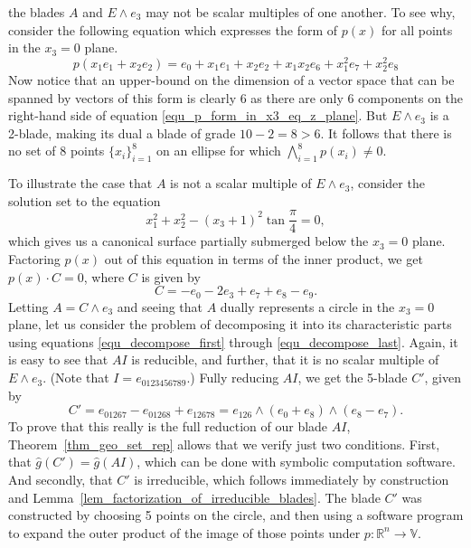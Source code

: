 \documentclass{birkjour}
\theoremstyle{definition}
\theoremstyle{remark}
\numberwithin{equation}{section}
\newcommand{\R}{\mathbb{R}}
\newcommand{\V}{\mathbb{V}}
\newcommand{\gh}{\hat{g}}
\begin{document}
the blades $A$ and $E\wedge e_3$ may not be scalar multiples of one another.
To see why, consider the following equation which expresses the form of $p(x)$ for all points in the $x_3=0$ plane.
\begin{equation}\label{equ_p_form_in_x3_eq_z_plane}
p(x_1e_1+x_2e_2)=e_0 + x_1e_1 + x_2e_2 + x_1x_2e_6 + x_1^2e_7 + x_2^2e_8
\end{equation}
Now notice that an upper-bound on the dimension of a vector space that can be spanned by vectors
of this form is clearly 6 as there are only 6 components on the right-hand side of equation \eqref{equ_p_form_in_x3_eq_z_plane}.
But $E\wedge e_3$ is a 2-blade, making its dual a blade of grade $10-2=8>6$.  It follows that there is no set of
8 points $\{x_i\}_{i=1}^8$ on an ellipse for which $\bigwedge_{i=1}^8 p(x_i)\neq 0$.

To illustrate the case that $A$ is not a scalar multiple of $E\wedge e_3$, consider the solution set
to the equation
\begin{equation}
x_1^2 + x_2^2 - (x_3+1)^2\tan\frac{\pi}{4}=0,
\end{equation}
which gives us a canonical surface partially submerged below the $x_3=0$ plane.
Factoring $p(x)$ out of this equation in terms of the inner product, we get $p(x)\cdot C=0$,
where $C$ is given by
\begin{equation}
C = -e_0 - 2e_3 + e_7 + e_8 - e_9.
\end{equation}
Letting $A=C\wedge e_3$ and seeing that $A$ dually represents a circle in the $x_3=0$ plane, let us consider
the problem of decomposing it into its characteristic parts using equations
\eqref{equ_decompose_first} through \eqref{equ_decompose_last}.
Again, it is easy to see that $AI$ is reducible, and further, that it is no scalar multiple of $E\wedge e_3$.
(Note that $I=e_{0123456789}$.)
Fully reducing $AI$, we get the 5-blade $C'$, given by
\begin{equation}
C' = e_{01267} - e_{01268} + e_{12678} = e_{126}\wedge(e_0+e_8)\wedge(e_8-e_7).
\end{equation}
To prove that this really is the full reduction of our blade $AI$, Theorem~\ref{thm_geo_set_rep}
allows that we verify just two conditions.
First, that $\gh(C')=\gh(AI)$, which can be done with symbolic computation software.
And secondly, that $C'$ is irreducible, which follows immediately by construction and Lemma~\ref{lem_factorization_of_irreducible_blades}.
The blade $C'$ was constructed by choosing 5 points on the circle, and then using a software
program to expand the outer product of the image of those points under $p:\R^n\to\V$.
\end{document}
